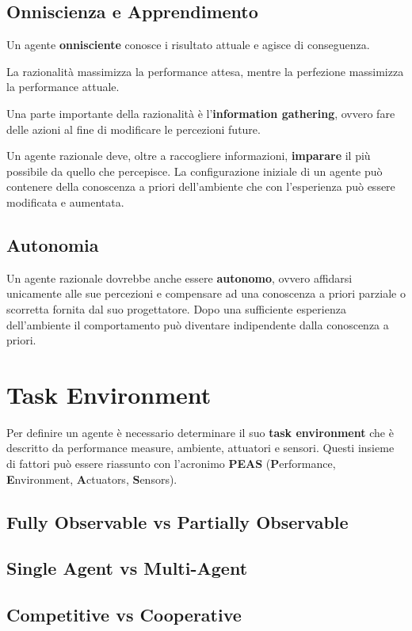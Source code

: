 \subsection{Onniscienza e Apprendimento}
Un agente \textbf{onnisciente} conosce i risultato attuale e agisce di conseguenza.

La razionalità massimizza la performance attesa, mentre la perfezione massimizza la performance attuale.

Una parte importante della razionalità è l'\textbf{information gathering}, ovvero fare delle azioni al fine di modificare le percezioni future.

Un agente razionale deve, oltre a raccogliere informazioni, \textbf{imparare} il più possibile da quello che percepisce. 
La configurazione iniziale di un agente può contenere della conoscenza a priori dell'ambiente che con l'esperienza può essere modificata e aumentata.

\subsection{Autonomia}
Un agente razionale dovrebbe anche essere \textbf{autonomo}, ovvero affidarsi unicamente alle sue percezioni e compensare ad una conoscenza a priori parziale o scorretta fornita 
dal suo progettatore. Dopo una sufficiente esperienza dell'ambiente il comportamento può diventare indipendente dalla conoscenza a priori. 

\section{Task Environment}
Per definire un agente è necessario determinare il suo \textbf{task environment} che è descritto da 
performance measure, ambiente, attuatori e sensori. 
Questi insieme di fattori può essere riassunto con l'acronimo \textbf{PEAS} (\textbf{P}erformance, \textbf{E}nvironment, \textbf{A}ctuators, \textbf{S}ensors).

\subsection{Fully Observable vs Partially Observable}
\subsection{Single Agent vs Multi-Agent}
\subsection{Competitive vs Cooperative}

